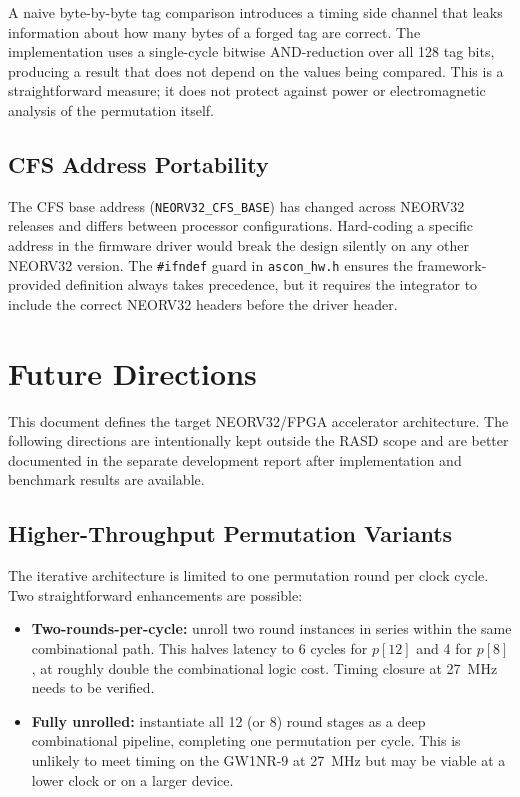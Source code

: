 \documentclass[11pt,a4paper]{article}
\begin{document}
A naive byte-by-byte tag comparison introduces a timing side channel that
leaks information about how many bytes of a forged tag are correct.
The implementation uses a single-cycle bitwise AND-reduction over all 128
tag bits, producing a result that does not depend on the values being compared.
This is a straightforward measure; it does not protect against power or
electromagnetic analysis of the permutation itself.

\subsection{CFS Address Portability}

The CFS base address (\texttt{NEORV32\_CFS\_BASE}) has changed across NEORV32
releases and differs between processor configurations. Hard-coding a specific
address in the firmware driver would break the design silently on any other
NEORV32 version. The \texttt{\#ifndef} guard in \texttt{ascon\_hw.h} ensures
the framework-provided definition always takes precedence, but it requires the
integrator to include the correct NEORV32 headers before the driver header.

\section{Future Directions}
\label{sec:future}

This document defines the target NEORV32/FPGA accelerator architecture. The
following directions are intentionally kept outside the RASD scope and are
better documented in the separate development report after implementation and
benchmark results are available.

\subsection{Higher-Throughput Permutation Variants}

The iterative architecture is limited to one permutation round per clock cycle.
Two straightforward enhancements are possible:

\begin{itemize}
  \item \textbf{Two-rounds-per-cycle:} unroll two round instances in series
        within the same combinational path. This halves latency to 6 cycles
        for $p[12]$ and 4 for $p[8]$, at roughly double the combinational logic
        cost. Timing closure at 27~MHz needs to be verified.
  \item \textbf{Fully unrolled:} instantiate all 12 (or 8) round stages as a
        deep combinational pipeline, completing one permutation per cycle.
        This is unlikely to meet timing on the GW1NR-9 at 27~MHz but may be
        viable at a lower clock or on a larger device.
\end{itemize}
\end{document}
